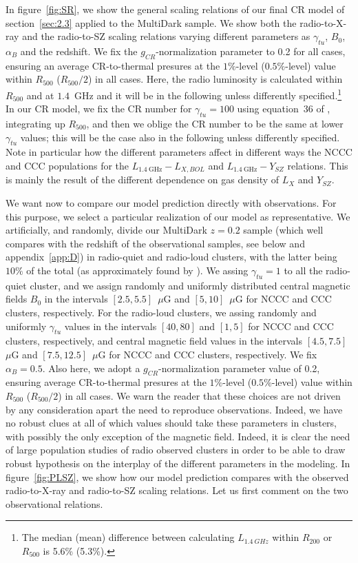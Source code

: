 \documentclass[traditabstract]{aa}
\newcommand{\rmn}{\mathrm}
\begin{document}
In figure~\ref{fig:SR}, we show the general scaling relations of our final CR model of section~\ref{sec:2.3} applied to the MultiDark sample. We show both the radio-to-X-ray  and the radio-to-SZ scaling relations varying different parameters as $\gamma_{tu}$, $B_{0}$, $\alpha_{B}$ and the redshift. We fix the $g_{CR}$-normalization parameter to 0.2 for all cases, ensuring an average CR-to-thermal presures at the $1\%$-level ($0.5\%$-level) value within $R_{500}$ ($R_{500}/2$) in all cases. Here, the radio luminosity is calculated within $R_{500}$ and at $1.4$~GHz and it will be in the following unless differently specified.\footnote[15]{The median (mean) difference between calculating $L_{1.4~GHz}$ within $R_{200}$ or $R_{500}$ is 5.6\% (5.3\%).} In our CR model, we fix the CR number for $\gamma_{tu}=100$ using equation~36 of \cite{2011A&A...527A..99E}, integrating up $R_{500}$, and then we oblige the CR number to be the same at lower $\gamma_{tu}$ values; this will be the case also in the following unless differently specified. Note in particular how the different parameters affect in different ways the NCCC and CCC populations for the $L_{1.4~\rmn{GHz}}-L_{X, BOL}$ and $L_{1.4~\rmn{GHz}}-Y_{SZ}$ relations. This is mainly the result of the different dependence on gas density of $L_{X}$ and $Y_{SZ}$.

We want now to compare our model prediction directly with observations. For this purpose, we select a particular realization of our model as representative. We artificially, and randomly, divide our MultiDark $z=0.2$ sample (which well compares with the redshift of the observational samples, see below and appendix~\ref{app:D}) in radio-quiet and radio-loud clusters, with the latter being $10\%$ of the total (as approximately found by \citealp{1999NewA....4..141G}). We assing $\gamma_{tu}=1$ to all the radio-quiet cluster, and we assign randomly and uniformly distributed central magnetic fields $B_0$ in the intervals $[2.5,5.5]$~$\mu$G and $[5,10]$~$\mu$G for NCCC and CCC clusters, respectively. For the radio-loud clusters, we assing randomly and uniformly $\gamma_{tu}$ values in the intervals $[40,80]$ and $[1,5]$ for NCCC and CCC clusters, respectively, and central magnetic field values in the intervals $[4.5,7.5]$~$\mu$G and $[7.5,12.5]$~$\mu$G for NCCC and CCC clusters, respectively. We fix $\alpha_B=0.5$. Also here, we adopt a $g_{CR}$-normalization parameter value of 0.2, ensuring average CR-to-thermal presures at the $1\%$-level ($0.5\%$-level) value within $R_{500}$ ($R_{500}/2$) in all cases. We warn the reader that these choices are not driven by any consideration apart the need to reproduce observations. Indeed, we have no robust clues at all of which values should take these parameters in clusters, with possibly the only exception of the magnetic field. Indeed, it is clear the need of large population studies of radio observed clusters in order to be able to draw robust hypothesis on the interplay of the different parameters in the modeling. In figure~\ref{fig:PLSZ}, we show how our model prediction compares with the observed radio-to-X-ray and radio-to-SZ scaling relations. Let us first comment on the two observational relations.
\end{document}
